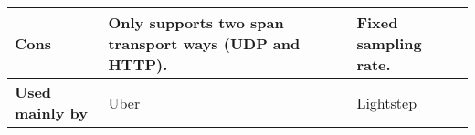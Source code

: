 \begin{table*}
\begin{tabularx}{\linewidth} {
            >{\hsize=0.70\hsize}X|
            >{\hsize=1.15\hsize}X|
            >{\hsize=1.15\hsize}X|}
        \textbf{Cons}
         & Only supports two span transport ways (UDP and HTTP).
         & Fixed sampling rate.                                                                                                                                                                                                                                               \\ \hline
        \textbf{Used mainly by}
         & Uber
         & Lightstep                                                                                                                                                                                                                                                          \\ \hline
    \end{tabularx}
\end{table*}